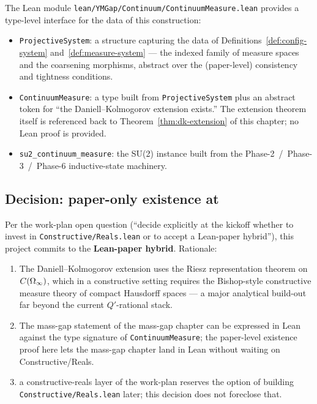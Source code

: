 The Lean module \texttt{lean/YMGap/Continuum/ContinuumMeasure.lean}
provides a type-level interface for the data of this construction:

\begin{itemize}
  \item \texttt{ProjectiveSystem}: a structure capturing the data of
    Definitions~\ref{def:config-system} and~\ref{def:measure-system}
    --- the indexed family of measure spaces and the coarsening
    morphisms, abstract over the (paper-level) consistency and
    tightness conditions.
  \item \texttt{ContinuumMeasure}: a type built from
    \texttt{ProjectiveSystem} plus an abstract token for ``the
    Daniell--Kolmogorov extension exists.''  The extension theorem
    itself is referenced back to Theorem~\ref{thm:dk-extension} of
    this chapter; no Lean proof is provided.
  \item \texttt{su2\_continuum\_measure}: the SU(2) instance built
    from the Phase-2~/~Phase-3~/~Phase-6 inductive-state machinery.
\end{itemize}

\subsection*{Decision: paper-only existence at }

Per the work-plan  open question (``decide explicitly
at the kickoff whether to invest in \texttt{Constructive/Reals.lean}
or to accept a Lean-paper hybrid''), this project commits to the
\textbf{Lean-paper hybrid}.  Rationale:

\begin{enumerate}
  \item The Daniell--Kolmogorov extension uses the Riesz representation
    theorem on $C(\Omega_\infty)$, which in a constructive setting requires
    the Bishop-style constructive measure theory of compact Hausdorff
    spaces --- a major analytical build-out far beyond the current
    $Q'$-rational stack.
  \item The mass-gap statement of the mass-gap chapter can be expressed in Lean
    against the type signature of \texttt{ContinuumMeasure}; the
    paper-level existence proof here lets the mass-gap chapter land in Lean without
    waiting on Constructive/Reals.
  \item a constructive-reals layer of the work-plan reserves the option of building
    \texttt{Constructive/Reals.lean} later; this decision does not
    foreclose that.
\end{enumerate}

